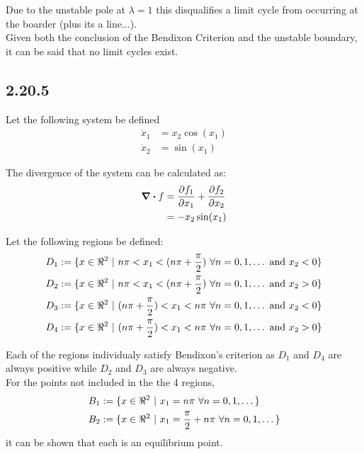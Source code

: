 \documentclass[letter]{article}
\begin{document}
Due to the unstable pole at $\lambda = 1$ this disqualifies a limit cycle from occurring at the boarder (plus its a line...).\\

Given both the conclusion of the Bendixon Criterion and the unstable boundary, it can be said that no limit cycles exist.




\newpage
\subsection{2.20.5}
Let the following system be defined
\begin{equation}
	\begin{aligned}
		\dot{x}_1 &= x_2 \cos(x_1)\\
		\dot{x}_2 &= \sin(x_1)
	\end{aligned}
\end{equation}

The divergence of the system can be calculated as:
\begin{align}
	\div f  &= \pdv{f_1}{x_1} + \pdv{f_2}{x_2} \nonumber\\
	&= -x_2 \sin(x_1)
\end{align}

Let the following regions be defined:
\begin{equation}
	\begin{aligned}
		D_1 := \{x \in \real^2 \ | \ n \pi < x_1 < (n \pi +\frac{\pi}{2}) \ \forall n = 0, 1, \dots \text{ and } x_2 < 0\}\\
		D_2 := \{x \in \real^2 \ | \ n \pi < x_1 < (n \pi +\frac{\pi}{2}) \ \forall n = 0, 1, \dots \text{ and } x_2 > 0\}\\
		D_3 := \{x \in \real^2 \ | \ (n \pi +\frac{\pi}{2}) < x_1 < n \pi \ \forall n = 0, 1, \dots \text{ and } x_2 < 0\}\\
		D_4 := \{x \in \real^2 \ | \ (n \pi +\frac{\pi}{2}) < x_1 < n \pi \ \forall n = 0, 1, \dots \text{ and } x_2 > 0\}\\
	\end{aligned}
\end{equation}

Each of the regions individualy satisfy Bendixon's criterion as $D_1$ and $D_4$ are always positive while $D_2$ and $D_3$ are always negative.\\

For the points not included in the the 4 regions,
\begin{equation}
	\begin{aligned}
		B_1 &:= \{x \in \real^2 \ | \ x_1 = n \pi \ \forall n = 0, 1, \dots\}\\
		B_2 &:= \{x \in \real^2 \ | \ x_1 = \frac{\pi}{2} + n \pi \ \forall n = 0, 1, \dots\}
	\end{aligned}
\end{equation}
it can be shown that each is an equilibrium point.
\end{document}
